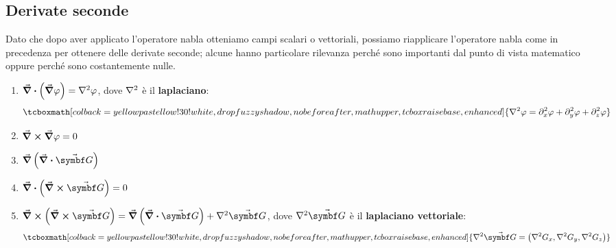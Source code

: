 \subsection{Derivate seconde}
Dato che dopo aver applicato l'operatore nabla otteniamo campi scalari o vettoriali, possiamo riapplicare l'operatore nabla come in precedenza per ottenere delle derivate seconde; alcune hanno particolare rilevanza perché sono importanti dal punto di vista matematico oppure perché sono costantemente nulle.
\begin{enumerate}[label=\roman*)]
	\item  $\div{\left(\grad\phi\right)}=\laplacian{\phi}$, dove $\laplacian$ è il \textbf{laplaciano}:
	\begin{equation}
		\tcboxmath[colback=yellowpastellow!30!white,drop fuzzy shadow, nobeforeafter, math upper, tcbox raise base, enhanced]{\laplacian{\phi}=\partial^2_x\phi+\partial^2_y\phi+\partial^2_z\phi}\label{laplacianocartesiano}
	\end{equation}
	\item $\curl{\grad{\varphi}}=0$
	\item $\grad{\left(\div{\vba{G}}\right)}$
	\item $\div{\left(\curl{\vba{G}}\right)}=0$
	\item $\curl{\left(\curl{\vba{G}}\right)}=\grad{\left(\div{\vba{G}}\right)}+\laplacian{\vba{G}}$, dove $\laplacian{\vba{G}}$ è il \textbf{laplaciano vettoriale}:
	\begin{equation}
		\tcboxmath[colback=yellowpastellow!30!white,drop fuzzy shadow, nobeforeafter, math upper, tcbox raise base, enhanced]{\laplacian{\vba{G}}=\left(\laplacian{G_x},\laplacian{G_y},\laplacian{G_z}\right)}
	\end{equation}
\end{enumerate}

